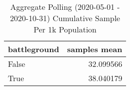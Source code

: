 \begin{table}
\centering
\caption{Aggregate Polling (2020-05-01 - 2020-10-31) Cumulative Sample Per 1k Population}
\label{table:aggregate\_polling\_2020-05-01\_-\_2020-10-31\_cumulative\_sample\_per\_1k\_population}
\begin{tabular}{lr}
\toprule
 battleground &  samples mean \\
\midrule
        False &     32.099566 \\
         True &     38.040179 \\
\bottomrule
\end{tabular}
\end{table}
